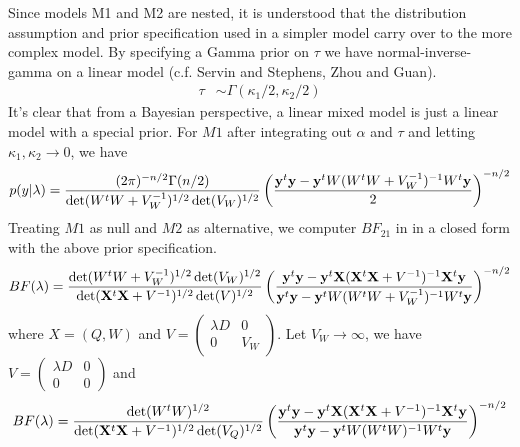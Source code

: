 \documentclass[11pt,Times]{article}
\begin{document}
Since models M1 and M2 are nested, it is understood that the distribution assumption and prior specification used in a simpler model carry over to the more complex model. 
By specifying a Gamma prior on $\tau$ we have normal-inverse-gamma on a linear model (c.f. Servin and Stephens, Zhou and Guan). 
%
\begin{equation}\label{invG}
\begin{aligned}
\tau & \sim \Gamma(\kappa_1/2, \kappa_2/2)
\end{aligned}
\end{equation}
It's clear that from a Bayesian perspective, a linear mixed model is just a linear model with a special prior.  
For $M1$ after integrating out $\alpha$ and $\tau$ and letting $\kappa_1,\kappa_2 \rightarrow 0$, we have
\begin{equation}
\begin{aligned}
p(y|\lambda) 
&= \frac{(2 \pi)^{-n/2} \Gamma(n/2)}{\det(W^tW+V_W^{-1})^{1/2} \det(V_W)^{1/2}} \left(\frac{{\mathbf{y}}^t{\mathbf{y}}-{\mathbf{y}}^t W (W^t W+ V_W^{-1})^{-1} W^t {\mathbf{y}}}{2}\right)^{-n/2} \\
\end{aligned}
\end{equation}
%
Treating $M1$ as null and $M2$ as alternative, we computer $BF_{21}$ in in a closed form with the above prior specification.   
%
\begin{equation}
\begin{aligned}
BF(\lambda) &= \frac{\det(W^tW+V_W^{-1})^{1/2} \det(V_W)^{1/2}}{\det({\mathbf{X}}^t {\mathbf{X}} + V^{-1})^{1/2} \det(V)^{1/2}} \left( \frac{{\mathbf{y}}^t {\mathbf{y}} - {\mathbf{y}}^t {\mathbf{X}} ({\mathbf{X}}^t {\mathbf{X}} + V^{-1})^{-1} {\mathbf{X}}^t {\mathbf{y}}} {{\mathbf{y}}^t{\mathbf{y}}-{\mathbf{y}}^t W (W^t W+ V_W^{-1})^{-1} W^t {\mathbf{y}}}   \right)^{-n/2} \\
\end{aligned}
\end{equation} 
where $X = (Q, W)$ and $V = \left( \begin{smallmatrix} \lambda D & 0 \\  0 & V_W \end{smallmatrix} \right).$ Let $V_W \rightarrow \infty$, we have $V = \left( \begin{smallmatrix} \lambda D & 0 \\  0 & 0 \end{smallmatrix} \right)$ and  
\begin{equation}\label{BF}
\begin{aligned}
BF(\lambda) &= \frac{\det(W^tW)^{1/2} }{\det({\mathbf{X}}^t {\mathbf{X}} + V^{-1})^{1/2} \det(V_Q)^{1/2}} \left( \frac{{\mathbf{y}}^t {\mathbf{y}} - {\mathbf{y}}^t {\mathbf{X}} ({\mathbf{X}}^t {\mathbf{X}} + V^{-1})^{-1} {\mathbf{X}}^t {\mathbf{y}}} {{\mathbf{y}}^t{\mathbf{y}}-{\mathbf{y}}^t W (W^t W)^{-1} W^t {\mathbf{y}}}   \right)^{-n/2} \\
\end{aligned}
\end{equation} 
\end{document}
